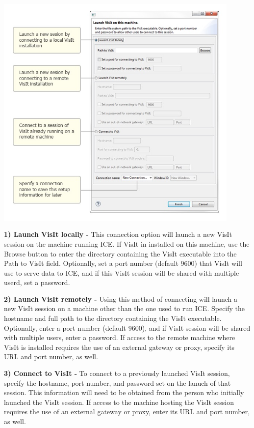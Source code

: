 \documentclass{article}
\begin{document}
\begin{center}
\includegraphics[width=12cm]{images/ICE_VisItLaunchOptions}
\end{center}

\textbf{1) Launch VisIt locally -} This connection option will launch a new
VisIt session on the machine running ICE. If VisIt in installed on this machine,
use the Browse button to enter the directory containing the VisIt executable
into the Path to VisIt field. Optionally, set a port number (default 9600) that
VisIt will use to serve data to ICE, and if this VisIt session will be shared
with multiple userd, set a password.

\textbf{2) Launch VisIt remotely -} Using this method of connecting will launch
a new VisIt session on a machine other than the one used to run ICE. Specify the
hostname and full path to the directory containing the VisIt executable.
Optionally, enter a port number (default 9600), and if VisIt session will be
shared with multiple users, enter a password. If access to the remote machine
where VisIt is installed requires the use of an external gateway or proxy,
specify its URL and port number, as well.

\textbf{3) Connect to VisIt -} To connect to a previously launched VisIt
session, specify the hostname, port number, and password set on the lanuch of
that session. This information will need to be obtained from the person who
initially launched the VisIt session. If access to the machine hosting the VisIt
session requires the use of an external gateway or proxy, enter its URL and port
number, as well.
\end{document}
